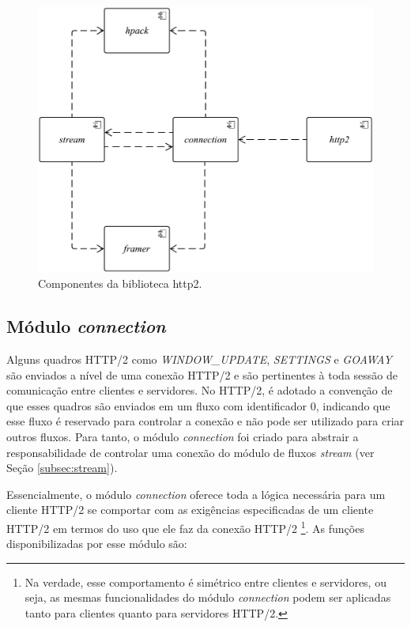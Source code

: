 \begin{figure}[hbt!]
 \centering
  \includegraphics[width=\textwidth]{./fig/source}
 \caption{Componentes da biblioteca http2.}
 \label{fig:source}
\end{figure}

\subsection{Módulo {\em connection}}
\label{subsec:connection}

Alguns quadros HTTP/2 como {\em WINDOW\_UPDATE}, {\em SETTINGS} e {\em GOAWAY} são enviados a nível de uma conexão HTTP/2 e são pertinentes à toda sessão de comunicação entre clientes e servidores. No HTTP/2, é adotado a convenção de que esses quadros são enviados em um fluxo com identificador 0, indicando que esse fluxo é reservado para controlar a conexão e não pode ser utilizado para criar outros fluxos. Para tanto, o módulo {\em connection} foi criado para abstrair a responsabilidade de controlar uma conexão do módulo de fluxos {\em stream} (ver Seção \ref{subsec:stream}).

Essencialmente, o módulo {\em connection} oferece toda a lógica necessária para um cliente HTTP/2 se comportar com as exigências especificadas de um cliente HTTP/2 em termos do uso que ele faz da conexão HTTP/2 \footnote{Na verdade, esse comportamento é simétrico entre clientes e servidores, ou seja, as mesmas funcionalidades do módulo {\em connection} podem ser aplicadas tanto para clientes quanto para servidores HTTP/2.}. As funções disponibilizadas por esse módulo são:

